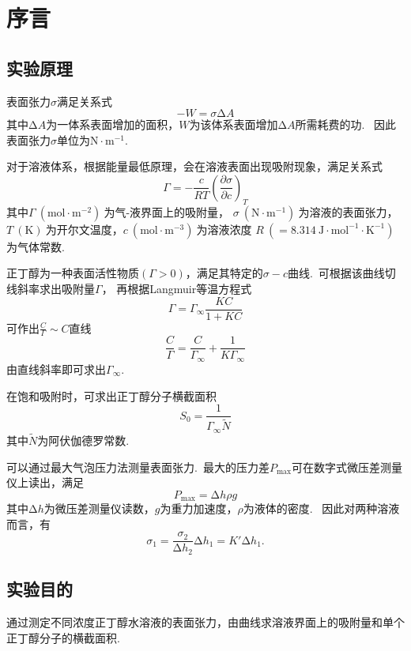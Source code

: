 
\chapter{序言}

\section{实验原理}
表面张力$\sigma$满足关系式
\begin{equation}
  -W=\sigma \increment A
\end{equation}
其中$\increment A$为一体系表面增加的面积，$W$为该体系表面增加$\increment A$所需耗费的功.~
因此表面张力$\sigma$单位为$\text{N}\cdot \text{m}^{-1}$.

对于溶液体系，根据能量最低原理，会在溶液表面出现吸附现象，满足关系式
\begin{equation}
  \Gamma = -\frac{c}{RT}\left(\frac{\partial \sigma}{\partial c}\right)_T
\end{equation}
其中$\Gamma~\left(\text{mol}\cdot\text{m}^{-2}\right)~$为气-液界面上的吸附量，
$\sigma~\left(\text{N}\cdot \text{m}^{-1}\right)~$为溶液的表面张力，
$T~\left(\text{K}\right)~$为开尔文温度，$c~\left(\text{mol}\cdot\text{m}^{-3}\right)~$为溶液浓度
$R~\left(=8.314~\text{J}\cdot\text{mol}^{-1}\cdot\text{K}^{-1}\right)~$为气体常数.~

正丁醇为一种表面活性物质$\left(\Gamma>0\right)$，满足其特定的$\sigma-c$曲线.~可根据该曲线切线斜率求出吸附量$\Gamma$，
再根据Langmuir等温方程式
\begin{equation}
  \Gamma=\Gamma_{\infty}\frac{KC}{1+KC}
\end{equation}
可作出$\frac{C}{\Gamma}\sim C$直线
\begin{equation}
  \frac{C}{\Gamma}=\frac{C}{\Gamma_{\infty}}+\frac{1}{K\Gamma_{\infty}}
\end{equation}
由直线斜率即可求出$\Gamma_{\infty}$.~

在饱和吸附时，可求出正丁醇分子横截面积
\begin{equation}
  S_0=\frac{1}{\Gamma_{\infty}\widetilde{N}}
\end{equation}
其中$\widetilde{N}$为阿伏伽德罗常数.

可以通过最大气泡压力法测量表面张力.~最大的压力差$P_{\max}$可在数字式微压差测量仪上读出，满足
\begin{equation}
  P_{\max}=\increment h\rho g
\end{equation}
其中$\increment h$为微压差测量仪读数，$g$为重力加速度，$\rho$为液体的密度.~
因此对两种溶液而言，有
\begin{equation}
  \sigma_1=\frac{\sigma_2}{\increment h_2}\increment h_1=K'\increment h_1.
\end{equation}

\section{实验目的}
通过测定不同浓度正丁醇水溶液的表面张力，由曲线求溶液界面上的吸附量和单个正丁醇分子的横截面积.